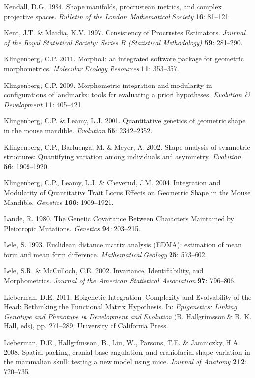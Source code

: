 \documentclass[12pt,]{article}
\begin{document}
Kendall, D.G. 1984. Shape manifolds, procrustean metrics, and complex
projective spaces. \emph{Bulletin of the London Mathematical Society}
\textbf{16}: 81--121.

Kent, J.T. \& Mardia, K.V. 1997. Consistency of Procrustes Estimators.
\emph{Journal of the Royal Statistical Society: Series B (Statistical
Methodology)} \textbf{59}: 281--290.

Klingenberg, C.P. 2011. MorphoJ: an integrated software package for
geometric morphometrics. \emph{Molecular Ecology Resources} \textbf{11}:
353--357.

Klingenberg, C.P. 2009. Morphometric integration and modularity in
configurations of landmarks: tools for evaluating a priori hypotheses.
\emph{Evolution \& Development} \textbf{11}: 405--421.

Klingenberg, C.P. \& Leamy, L.J. 2001. Quantitative genetics of
geometric shape in the mouse mandible. \emph{Evolution} \textbf{55}:
2342--2352.

Klingenberg, C.P., Barluenga, M. \& Meyer, A. 2002. Shape analysis of
symmetric structures: Quantifying variation among individuals and
asymmetry. \emph{Evolution} \textbf{56}: 1909--1920.

Klingenberg, C.P., Leamy, L.J. \& Cheverud, J.M. 2004. Integration and
Modularity of Quantitative Trait Locus Effects on Geometric Shape in the
Mouse Mandible. \emph{Genetics} \textbf{166}: 1909--1921.

Lande, R. 1980. The Genetic Covariance Between Characters Maintained by
Pleiotropic Mutations. \emph{Genetics} \textbf{94}: 203--215.

Lele, S. 1993. Euclidean distance matrix analysis (EDMA): estimation of
mean form and mean form difference. \emph{Mathematical Geology}
\textbf{25}: 573--602.

Lele, S.R. \& McCulloch, C.E. 2002. Invariance, Identifiability, and
Morphometrics. \emph{Journal of the American Statistical Association}
\textbf{97}: 796--806.

Lieberman, D.E. 2011. Epigenetic Integration, Complexity and
Evolvability of the Head: Rethinking the Functional Matrix Hypothesis.
In: \emph{Epigenetics: Linking Genotype and Phenotype in Development and
Evolution} (B. Hallgrímsson \& B. K. Hall, eds), pp. 271--289.
University of California Press.

Lieberman, D.E., Hallgrímsson, B., Liu, W., Parsons, T.E. \& Jamniczky,
H.A. 2008. Spatial packing, cranial base angulation, and craniofacial
shape variation in the mammalian skull: testing a new model using mice.
\emph{Journal of Anatomy} \textbf{212}: 720--735.
\end{document}
